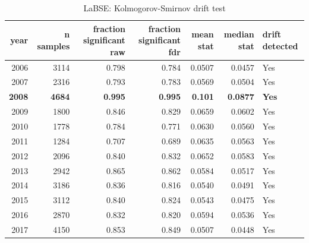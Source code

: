\begin{table}[ht]
\centering
\caption{LaBSE: Kolmogorov-Smirnov drift test}
\label{tab:labse_ks}
\begin{tabular}{rrrrrrl}
\toprule
year & n samples & fraction significant raw & fraction significant fdr & mean stat & median stat & drift detected \\
\midrule
2006 & 3114 & 0.798 & 0.784 & 0.0507 & 0.0457 & Yes \\
2007 & 2316 & 0.793 & 0.783 & 0.0569 & 0.0504 & Yes \\
\textbf{2008} & \textbf{4684} & \textbf{0.995} & \textbf{0.995} & \textbf{0.101} & \textbf{0.0877} & \textbf{Yes} \\
2009 & 1800 & 0.846 & 0.829 & 0.0659 & 0.0602 & Yes \\
2010 & 1778 & 0.784 & 0.771 & 0.0630 & 0.0560 & Yes \\
2011 & 1284 & 0.707 & 0.689 & 0.0635 & 0.0563 & Yes \\
2012 & 2096 & 0.840 & 0.832 & 0.0652 & 0.0583 & Yes \\
2013 & 2942 & 0.865 & 0.862 & 0.0584 & 0.0517 & Yes \\
2014 & 3186 & 0.836 & 0.816 & 0.0540 & 0.0491 & Yes \\
2015 & 3112 & 0.840 & 0.824 & 0.0543 & 0.0475 & Yes \\
2016 & 2870 & 0.832 & 0.820 & 0.0594 & 0.0536 & Yes \\
2017 & 4150 & 0.853 & 0.849 & 0.0507 & 0.0448 & Yes \\
\bottomrule
\end{tabular}
\end{table}
